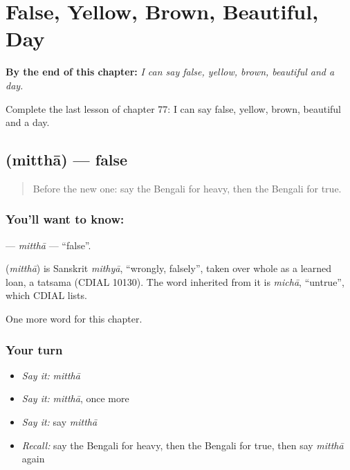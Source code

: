 
\chapter{False, Yellow, Brown, Beautiful, Day}
\label{ch:bn-false-yellow-brown-beautiful-day}

\begin{chapteropening}
\textbf{By the end of this chapter:} \emph{I can say false, yellow, brown, beautiful and a day.}

Complete the last lesson of chapter 77: I can say false, yellow, brown, beautiful and a day.
\end{chapteropening}

\section[\texorpdfstring{\bn{মিথ্যা} (mitthā)}{মিথ্যা (mitthā)}]{ (mitthā) — false}

\label{lesson:BN-C77-mittha}



\begin{quote}
Before the new one: say the Bengali for heavy, then the Bengali for true.
\end{quote}

\subsection*{You'll want to know: }
\textbf{} — \emph{mitthā} — \textquotedblleft{}false\textquotedblright{}.

\begin{cousinweb}
\textbf{} (\emph{mitthā}) is Sanskrit \emph{mithyā}, \textquotedblleft{}wrongly, falsely\textquotedblright{}, taken over whole as a learned loan, a tatsama (CDIAL 10130). The word inherited from it is \emph{michā}, \textquotedblleft{}untrue\textquotedblright{}, which CDIAL lists.
\end{cousinweb}

\begin{grammarlens}[title={What you've built}]
One more word for this chapter.
\end{grammarlens}

\subsection*{Your turn}
\begin{itemize}
\raggedright
  \item \emph{Say it:} \emph{mitthā}
  \item \emph{Say it:} \emph{mitthā}, once more
  \item \emph{Say it:} say \emph{mitthā}
  \item \emph{Recall:} say the Bengali for heavy, then the Bengali for true, then say \emph{mitthā} again
\end{itemize}

